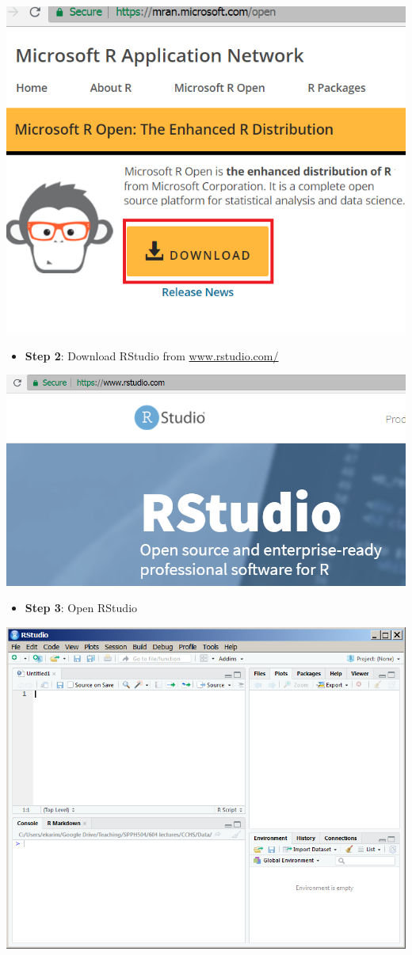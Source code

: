 \documentclass[
]{book}
\providecommand{\tightlist}{%
  \setlength{\itemsep}{0pt}\setlength{\parskip}{0pt}}
\begin{document}
\includegraphics[width=0.65\linewidth]{images/R01}

\begin{itemize}
\tightlist
\item
  \textbf{Step 2}: Download RStudio from \href{https://www.rstudio.com/}{www.rstudio.com/}
\end{itemize}

\includegraphics[width=0.65\linewidth]{images/R02}

\begin{itemize}
\tightlist
\item
  \textbf{Step 3}: Open RStudio
\end{itemize}

\includegraphics[width=0.65\linewidth]{images/R04}
\end{document}
